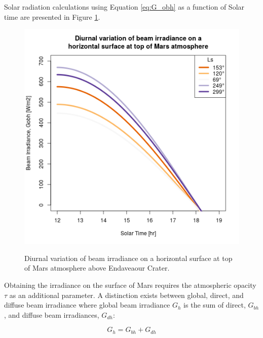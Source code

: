 Solar radiation calculations using Equation \ref{eq:G_obh} as a function of Solar time are presented in Figure \ref{fig:plot:diurnal-variation-of-beam-irradiance-on-a-horizontal-surface-at-top-of-mars-atmosphere}.

\begin{figure}[H]
  \centering
  \hypersetup{linkcolor=captionTextColor}
  \includegraphics[width=0.8\linewidth]{sections/martian-environment/plots/diurnal-variation-of-beam-irradiance-on-a-horizontal-surface-at-top-of-mars-atmosphere.png}\\
  \caption[Diurnal variation of beam irradiance on a horizontal surface at top of Mars atmosphere above Endaveaour Crater]
  {Diurnal variation of beam irradiance on a horizontal surface at top of Mars atmosphere above Endaveaour Crater.}
  \label{fig:plot:diurnal-variation-of-beam-irradiance-on-a-horizontal-surface-at-top-of-mars-atmosphere}
\end{figure}

Obtaining the irradiance on the surface of Mars requires the atmospheric opacity $\tau$ as an additional parameter. A distinction exists between global, direct, and diffuse beam irradiance where global beam irradiance $G_{h}$ is the sum of direct, $G_{bh}$, and diffuse beam irradiances, $G_{dh}$:


\begin{equation}
  \label{eq:G_h_1}
  G_{h} = G_{bh} + G_{dh}
\end{equation}

